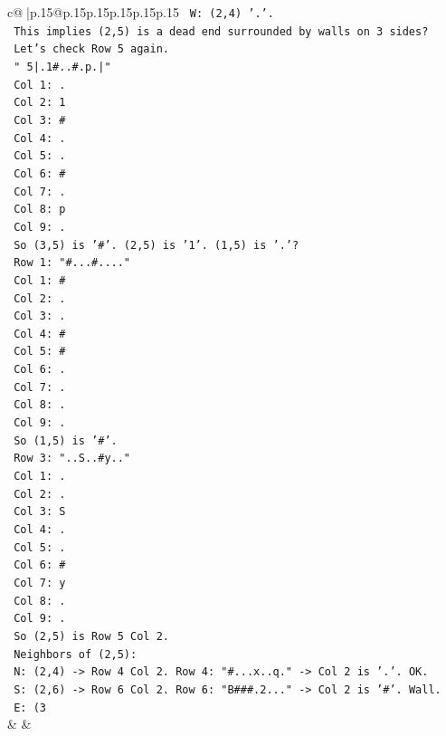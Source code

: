 \documentclass{article}
\begin{document}
{\begin{supertabular}{c@{$\;$}|p{.15\linewidth}@{}p{.15\linewidth}p{.15\linewidth}p{.15\linewidth}p{.15\linewidth}p{.15\linewidth}}
{{{\texttt{  W: (2,4) '.'.} \\
\texttt{  This implies (2,5) is a dead end surrounded by walls on 3 sides?} \\
\texttt{  Let's check Row 5 again.} \\
\texttt{  " 5|.1\#..\#.p.|"} \\
\texttt{  Col 1: .} \\
\texttt{  Col 2: 1} \\
\texttt{  Col 3: \#} \\
\texttt{  Col 4: .} \\
\texttt{  Col 5: .} \\
\texttt{  Col 6: \#} \\
\texttt{  Col 7: .} \\
\texttt{  Col 8: p} \\
\texttt{  Col 9: .} \\
\texttt{  So (3,5) is '\#'. (2,5) is '1'. (1,5) is '.'?} \\
\texttt{  Row 1: "\#...\#...."} \\
\texttt{  Col 1: \#} \\
\texttt{  Col 2: .} \\
\texttt{  Col 3: .} \\
\texttt{  Col 4: \#} \\
\texttt{  Col 5: \#} \\
\texttt{  Col 6: .} \\
\texttt{  Col 7: .} \\
\texttt{  Col 8: .} \\
\texttt{  Col 9: .} \\
\texttt{  So (1,5) is '\#'.} \\
\texttt{  Row 3: "..S..\#y.."} \\
\texttt{  Col 1: .} \\
\texttt{  Col 2: .} \\
\texttt{  Col 3: S} \\
\texttt{  Col 4: .} \\
\texttt{  Col 5: .} \\
\texttt{  Col 6: \#} \\
\texttt{  Col 7: y} \\
\texttt{  Col 8: .} \\
\texttt{  Col 9: .} \\
\texttt{  So (2,5) is Row 5 Col 2.} \\
\texttt{  Neighbors of (2,5):} \\
\texttt{  N: (2,4) {-}> Row 4 Col 2. Row 4: "\#...x..q." {-}> Col 2 is '.'. OK.} \\
\texttt{  S: (2,6) {-}> Row 6 Col 2. Row 6: "B\#\#\#.2..." {-}> Col 2 is '\#'. Wall.} \\
\texttt{  E: (3} \\
            }
        }
    }
    & & \\ \\


\end{supertabular}}
\end{document}
